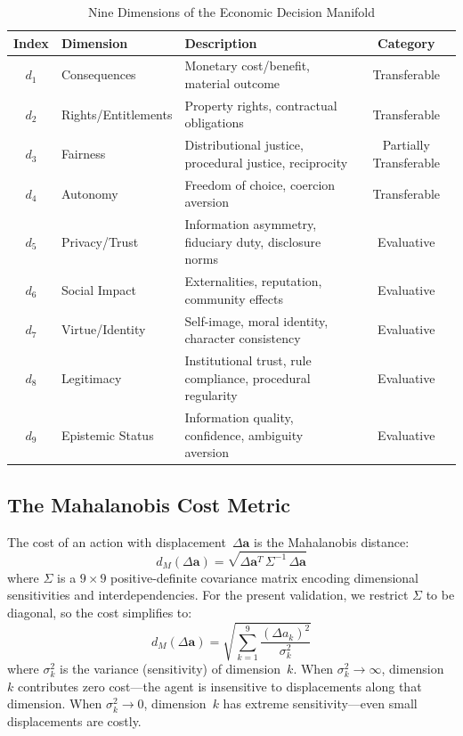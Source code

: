 \documentclass[journal]{IEEEtran}
\begin{document}
\begin{table}[!t]
\renewcommand{\arraystretch}{1.2}
\caption{Nine Dimensions of the Economic Decision Manifold}
\label{tab:dimensions}
\centering
\begin{tabular}{c l l c}
\toprule
\textbf{Index} & \textbf{Dimension} & \textbf{Description} & \textbf{Category} \\
\midrule
$d_1$ & Consequences & Monetary cost/benefit, material outcome & Transferable \\
$d_2$ & Rights/Entitlements & Property rights, contractual obligations & Transferable \\
$d_3$ & Fairness & Distributional justice, procedural justice, reciprocity & Partially Transferable \\
$d_4$ & Autonomy & Freedom of choice, coercion aversion & Transferable \\
$d_5$ & Privacy/Trust & Information asymmetry, fiduciary duty, disclosure norms & Evaluative \\
$d_6$ & Social Impact & Externalities, reputation, community effects & Evaluative \\
$d_7$ & Virtue/Identity & Self-image, moral identity, character consistency & Evaluative \\
$d_8$ & Legitimacy & Institutional trust, rule compliance, procedural regularity & Evaluative \\
$d_9$ & Epistemic Status & Information quality, confidence, ambiguity aversion & Evaluative \\
\bottomrule
\end{tabular}
\end{table}

\subsection{The Mahalanobis Cost Metric}

The cost of an action with displacement~$\Delta\mathbf{a}$ is the Mahalanobis distance:
\begin{equation}
    d_M(\Delta\mathbf{a}) = \sqrt{\Delta\mathbf{a}^T \, \Sigma^{-1} \, \Delta\mathbf{a}}
    \label{eq:mahalanobis}
\end{equation}
where $\Sigma$ is a $9 \times 9$ positive-definite covariance matrix encoding dimensional sensitivities and interdependencies.
For the present validation, we restrict $\Sigma$ to be diagonal, so the cost simplifies to:
\begin{equation}
    d_M(\Delta\mathbf{a}) = \sqrt{\sum_{k=1}^{9} \frac{(\Delta a_k)^2}{\sigma_k^2}}
    \label{eq:mahalanobis_diag}
\end{equation}
where $\sigma_k^2$ is the variance (sensitivity) of dimension~$k$.
When $\sigma_k^2 \to \infty$, dimension~$k$ contributes zero cost---the agent is insensitive to displacements along that dimension.
When $\sigma_k^2 \to 0$, dimension~$k$ has extreme sensitivity---even small displacements are costly.
\end{document}
